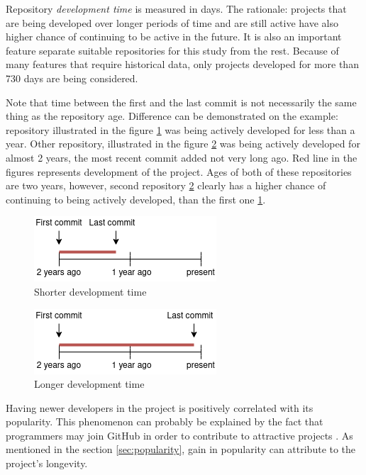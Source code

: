 Repository \emph{development time} \label{feature:development_time} is measured in days.
The rationale: projects that are being developed over longer periods of time and are still active have also higher chance of continuing to be active in the future.
It is also an important feature separate suitable repositories for this study from the rest.
Because of many features that require historical data, only projects developed for more than 730 days are being considered.

Note that time between the first and the last commit is not necessarily the same thing as the repository age.
Difference can be demonstrated on the example: repository illustrated in the figure \ref{fig:repo_age} was being actively developed for less than a year.
Other repository, illustrated in the figure \ref{fig:development_age} was being actively developed for almost 2 years, the most recent commit added not very long ago.
Red line in the figures represents development of the project.
Ages of both of these repositories are two years, however, second repository \ref{fig:development_age} clearly has a higher chance of continuing to being actively developed, than the first one \ref{fig:repo_age}.

\begin{figure}
    \centering
    \includegraphics[scale=0.75]{chapters/chapter2/repo_age.png}
    \caption{Shorter development time}
    \label{fig:repo_age}
\end{figure}

\begin{figure}
    \centering
    \includegraphics[scale=0.75]{chapters/chapter2/development_age.png}
    \caption{Longer development time}
    \label{fig:development_age}
\end{figure}

Having newer developers in the project is positively correlated with its popularity.
This phenomenon can probably be explained by the fact that programmers may join GitHub in order to contribute to attractive projects \cite{p:14}.
As mentioned in the section \ref{sec:popularity}, gain in popularity can attribute to the project's longevity.

